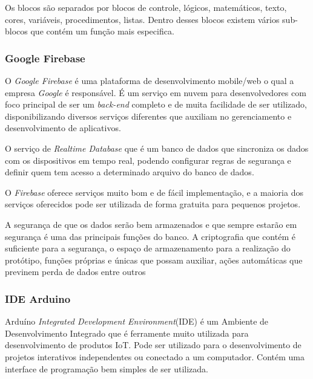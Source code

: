 \documentclass[12pt]{article}
\begin{document}
Os blocos são separados por blocos de controle, lógicos, matemáticos, texto, cores, variáveis, procedimentos, listas. Dentro desses blocos existem vários sub-blocos que contém um função mais especifica. 


\subsubsection{Google Firebase}

O \textit{Google Firebase} é uma plataforma de desenvolvimento mobile/web o qual a empresa \textit{Google} é responsável.
É um serviço em nuvem para desenvolvedores com foco principal de ser um \textit{back-end} completo e de muita facilidade de ser utilizado, disponibilizando diversos serviços diferentes que auxiliam no gerenciamento e desenvolvimento de aplicativos.

O serviço de \textit{Realtime Database} que é um banco de dados que sincroniza os dados com os dispositivos em tempo real, podendo configurar regras de segurança e definir quem tem acesso a determinado arquivo do banco de dados.

O \textit{Firebase} oferece serviços muito bom e de fácil implementação, e a maioria dos serviços oferecidos pode ser utilizada de forma gratuita para pequenos projetos.

A segurança de que os dados serão bem armazenados e que sempre estarão em segurança é uma das principais funções do banco. A criptografia que contém é suficiente para a segurança, o espaço de armazenamento para a realização do protótipo, funções próprias e únicas que possam auxiliar, ações automáticas que previnem perda de dados entre outros

\subsubsection{IDE Arduino}
Arduíno \textit{Integrated Development Environment}(IDE) é um Ambiente de Desenvolvimento Integrado que é ferramente muito utilizada para desenvolvimento de produtos IoT. Pode ser utilizado para o desenvolvimento de projetos interativos independentes ou conectado a um computador. Contém uma interface de programação bem simples de ser utilizada.
\end{document}
